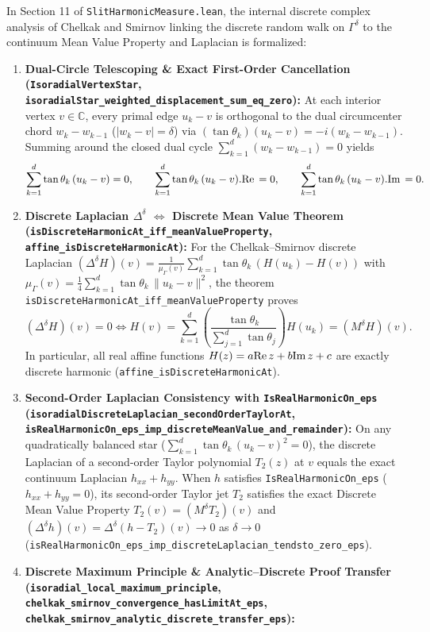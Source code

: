 \documentclass[]{amsart}
\numberwithin{equation}{section}
\newcommand{\C}{\mathbb{C}}
\newcommand{\re}{\mbox{\rm Re\,}}
\newcommand{\im}{\mbox{\rm Im\,}}
\begin{document}
In Section 11 of \texttt{SlitHarmonicMeasure.lean}, the internal discrete complex analysis of Chelkak and Smirnov \cite[Secs.~2.1--2.2 \& Sec.~3]{CS} linking the discrete random walk on $\varGamma^{\delta}$ to the continuum Mean Value Property and Laplacian is formalized:
\begin{enumerate}
\item \textbf{Dual-Circle Telescoping \& Exact First-Order Cancellation (\texttt{IsoradialVertexStar}, \texttt{isoradialStar\_weighted\_displacement\_sum\_eq\_zero}):}
At each interior vertex $v \in \C$, every primal edge $u_k - v$ is orthogonal to the dual circumcenter chord $w_k - w_{k-1}$ ($|w_k - v| = \delta$) via $(\tan\theta_k)(u_k - v) = -i(w_k - w_{k-1})$. Summing around the closed dual cycle $\sum_{k=1}^d (w_k - w_{k-1}) = 0$ yields
\[
\sum_{k=1}^d \tan\theta_k\,(u_k - v) = 0, \qquad
\sum_{k=1}^d \tan\theta_k\,(u_k - v).\re = 0, \qquad
\sum_{k=1}^d \tan\theta_k\,(u_k - v).\im = 0.
\]
\item \textbf{Discrete Laplacian $\Delta^{\delta}$ $\iff$ Discrete Mean Value Theorem (\texttt{isDiscreteHarmonicAt\_iff\_meanValueProperty}, \texttt{affine\_isDiscreteHarmonicAt}):}
For the Chelkak--Smirnov discrete Laplacian $(\Delta^{\delta} H)(v) = \frac{1}{\mu_{\varGamma}(v)}\sum_{k=1}^d \tan\theta_k\,(H(u_k) - H(v))$ with $\mu_{\varGamma}(v) = \frac{1}{4}\sum_{k=1}^d \tan\theta_k\,\|u_k - v\|^2$, the theorem \texttt{isDiscreteHarmonicAt\_iff\_meanValueProperty} proves
\[
(\Delta^{\delta} H)(v) = 0 \iff H(v) = \sum_{k=1}^d \left(\frac{\tan\theta_k}{\sum_{j=1}^d \tan\theta_j}\right) H(u_k) = (M^{\delta} H)(v).
\]
In particular, all real affine functions $H(z) = a\re z + b\im z + c$ are exactly discrete harmonic (\texttt{affine\_isDiscreteHarmonicAt}).
\item \textbf{Second-Order Laplacian Consistency with \texttt{IsRealHarmonicOn\_eps} (\texttt{isoradialDiscreteLaplacian\_secondOrderTaylorAt}, \texttt{isRealHarmonicOn\_eps\_imp\_discreteMeanValue\_and\_remainder}):}
On any quadratically balanced star ($\sum_{k=1}^d \tan\theta_k\,(u_k - v)^2 = 0$), the discrete Laplacian of a second-order Taylor polynomial $T_2(z)$ at $v$ equals the exact continuum Laplacian $h_{xx} + h_{yy}$. When $h$ satisfies \texttt{IsRealHarmonicOn\_eps} ($h_{xx} + h_{yy} = 0$), its second-order Taylor jet $T_2$ satisfies the exact Discrete Mean Value Property $T_2(v) = (M^{\delta} T_2)(v)$ and $(\Delta^{\delta} h)(v) = \Delta^{\delta}(h - T_2)(v) \to 0$ as $\delta \to 0$ (\texttt{isRealHarmonicOn\_eps\_imp\_discreteLaplacian\_tendsto\_zero\_eps}).
\item \textbf{Discrete Maximum Principle \& Analytic--Discrete Proof Transfer (\texttt{isoradial\_local\_maximum\_principle}, \texttt{chelkak\_smirnov\_convergence\_hasLimitAt\_eps}, \texttt{chelkak\_smirnov\_analytic\_discrete\_transfer\_eps}):}

\end{enumerate}
\end{document}
